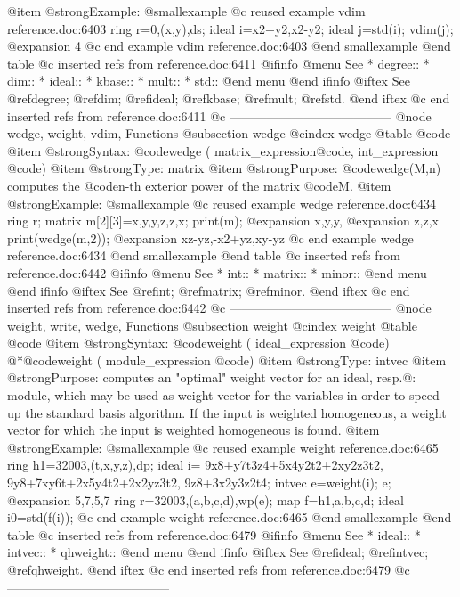 {{{{{{{@item @strong{Example:}
@smallexample
@c reused example vdim reference.doc:6403 
  ring r=0,(x,y),ds;
  ideal i=x2+y2,x2-y2;
  ideal j=std(i);
  vdim(j);
@expansion{} 4
@c end example vdim reference.doc:6403
@end smallexample
@end table
@c inserted refs from reference.doc:6411
@ifinfo
@menu
See
* degree::
* dim::
* ideal::
* kbase::
* mult::
* std::
@end menu
@end ifinfo
@iftex
See
@ref{degree};
@ref{dim};
@ref{ideal};
@ref{kbase};
@ref{mult};
@ref{std}.
@end iftex
@c end inserted refs from reference.doc:6411
@c ---------------------------------------
@node wedge, weight, vdim, Functions
@subsection wedge
@cindex wedge
@table @code
@item @strong{Syntax:}
@code{wedge (} matrix_expression@code{,} int_expression @code{)}
@item @strong{Type:}
matrix
@item @strong{Purpose:}
@code{wedge(M,n)} computes the @code{n}-th exterior power of the matrix
@code{M}.
@item @strong{Example:}
@smallexample
@c reused example wedge reference.doc:6434 
  ring r;
  matrix m[2][3]=x,y,y,z,z,x;
  print(m);
@expansion{} x,y,y,
@expansion{} z,z,x 
  print(wedge(m,2));
@expansion{} xz-yz,-x2+yz,xy-yz
@c end example wedge reference.doc:6434
@end smallexample
@end table
@c inserted refs from reference.doc:6442
@ifinfo
@menu
See
* int::
* matrix::
* minor::
@end menu
@end ifinfo
@iftex
See
@ref{int};
@ref{matrix};
@ref{minor}.
@end iftex
@c end inserted refs from reference.doc:6442
@c ---------------------------------------
@node weight, write, wedge, Functions
@subsection weight
@cindex weight
@table @code
@item @strong{Syntax:}
@code{weight (} ideal_expression @code{)}
@*@code{weight (} module_expression @code{)}
@item @strong{Type:}
intvec
@item @strong{Purpose:}
computes an "optimal" weight vector for an ideal, resp.@: module,
which may be used as weight vector for the variables in order to speed
up the standard basis algorithm. If the input is weighted homogeneous,
a weight vector for which the input is weighted homogeneous is found.
@item @strong{Example:}
@smallexample
@c reused example weight reference.doc:6465 
  ring h1=32003,(t,x,y,z),dp;
  ideal i=
  9x8+y7t3z4+5x4y2t2+2xy2z3t2,
  9y8+7xy6t+2x5y4t2+2x2yz3t2,
  9z8+3x2y3z2t4;
  intvec e=weight(i);
  e;
@expansion{} 5,7,5,7
  ring r=32003,(a,b,c,d),wp(e);
  map f=h1,a,b,c,d;
  ideal i0=std(f(i));
@c end example weight reference.doc:6465
@end smallexample
@end table
@c inserted refs from reference.doc:6479
@ifinfo
@menu
See
* ideal::
* intvec::
* qhweight::
@end menu
@end ifinfo
@iftex
See
@ref{ideal};
@ref{intvec};
@ref{qhweight}.
@end iftex
@c end inserted refs from reference.doc:6479
@c ---------------------------------------
}}}}}}}

